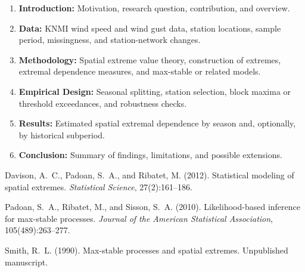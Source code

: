 \documentclass[11pt,a4paper]{article}
\begin{document}
\begin{enumerate}[label=\arabic*.]
    \item \textbf{Introduction:} Motivation, research question, contribution, and overview.
    \item \textbf{Data:} KNMI wind speed and wind gust data, station locations, sample period, missingness, and station-network changes.
    \item \textbf{Methodology:} Spatial extreme value theory, construction of extremes, extremal dependence measures, and max-stable or related models.
    \item \textbf{Empirical Design:} Seasonal splitting, station selection, block maxima or threshold exceedances, and robustness checks.
    \item \textbf{Results:} Estimated spatial extremal dependence by season and, optionally, by historical subperiod.
    \item \textbf{Conclusion:} Summary of findings, limitations, and possible extensions.
\end{enumerate}



\begin{thebibliography}{}

    Davison, A.~C., Padoan, S.~A., and Ribatet, M. (2012).
    \newblock Statistical modeling of spatial extremes.
    \newblock \emph{Statistical Science}, 27(2):161--186.

    Padoan, S.~A., Ribatet, M., and Sisson, S.~A. (2010).
    \newblock Likelihood-based inference for max-stable processes.
    \newblock \emph{Journal of the American Statistical Association}, 105(489):263--277.

    Smith, R.~L. (1990).
    \newblock Max-stable processes and spatial extremes.
    \newblock Unpublished manuscript.

\end{thebibliography}
\end{document}
